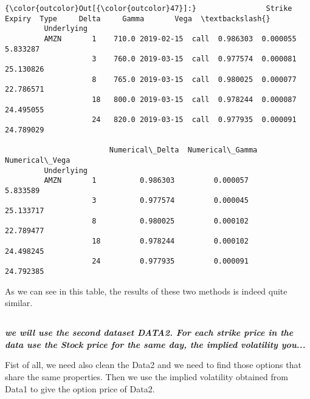 \documentclass[11pt]{article}
\begin{document}
\begin{Verbatim}[commandchars=\\\{\}]
{\color{outcolor}Out[{\color{outcolor}47}]:}                Strike     Expiry  Type     Delta     Gamma       Vega  \textbackslash{}
         Underlying                                                              
         AMZN       1    710.0 2019-02-15  call  0.986303  0.000055   5.833287   
                    3    760.0 2019-03-15  call  0.977574  0.000081  25.130826   
                    8    765.0 2019-03-15  call  0.980025  0.000077  22.786571   
                    18   800.0 2019-03-15  call  0.978244  0.000087  24.495055   
                    24   820.0 2019-03-15  call  0.977935  0.000091  24.789029   
         
                        Numerical\_Delta  Numerical\_Gamma  Numerical\_Vega  
         Underlying                                                       
         AMZN       1          0.986303         0.000057        5.833589  
                    3          0.977574         0.000045       25.133717  
                    8          0.980025         0.000102       22.789477  
                    18         0.978244         0.000102       24.498245  
                    24         0.977935         0.000091       24.792385  
\end{Verbatim}
            
    As we can see in this table, the results of these two methods is indeed
quite similar.

\subsection{}\label{section}

\textbf{\emph{we will use the second dataset DATA2. For each strike
price in the data use the Stock price for the same day, the implied
volatility you...}}

Fist of all, we need also clean the Data2 and we need to find those
options that share the same properties. Then we use the implied
volatility obtained from Data1 to give the option price of Data2.
\end{document}
